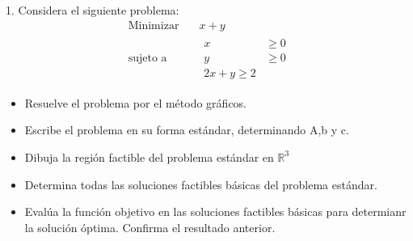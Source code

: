 \documentclass{article}
\begin{document}
1. Considera el siguiente problema:
\begin{equation*}
  \begin{aligned}
    \text{Minimizar}\quad & x+y\\
    \text{sujeto a}\quad  &
     \begin{aligned}
      x & \geq 0 \\
      y & \geq 0 \\
      2x+y \geq 2
     \end{aligned}
  \end{aligned}
\end{equation*}
\begin{itemize}
\item Resuelve el problema por el método gráficos.
\item Escribe el problema en su forma estándar, determinando A,b y c.
\item Dibuja la región factible del problema estándar en $\mathbb{R}^3$
\item Determina todas las soluciones factibles básicas del problema estándar.
\item Evalúa la función objetivo en las soluciones factibles básicas para determianr la solución óptima. Confirma el resultado anterior.
  
\end{itemize}
\end{document}
